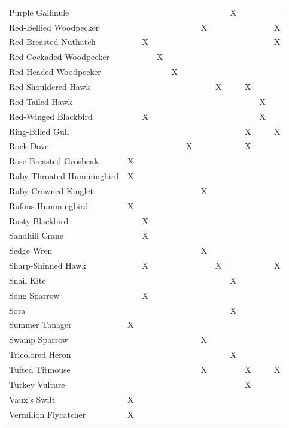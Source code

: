 \documentclass[]{article}
\begin{document}
\begin{longtable}{llllllllllll}
Purple Gallinule &  &  &  &  &  &  &  & X &  &  & \\
Red-Bellied Woodpecker &  &  &  &  &  & X &  &  &  &  & X\\
Red-Breasted Nuthatch &  & X &  &  &  &  &  &  &  &  & X\\
Red-Cockaded Woodpecker &  &  & X &  &  &  &  &  &  &  & \\
\addlinespace
Red-Headed Woodpecker &  &  &  & X &  &  &  &  &  &  & \\
Red-Shouldered Hawk &  &  &  &  &  &  & X &  & X &  & \\
Red-Tailed Hawk &  &  &  &  &  &  &  &  &  & X & \\
Red-Winged Blackbird &  & X &  &  &  &  &  &  &  & X & \\
Ring-Billed Gull &  &  &  &  &  &  &  &  & X &  & X\\
\addlinespace
Rock Dove &  &  &  &  & X &  &  &  & X &  & \\
Rose-Breasted Grosbeak & X &  &  &  &  &  &  &  &  &  & \\
Ruby-Throated Hummingbird & X &  &  &  &  &  &  &  &  &  & \\
Ruby Crowned Kinglet &  &  &  &  &  & X &  &  &  &  & \\
Rufous Hummingbird & X &  &  &  &  &  &  &  &  &  & \\
\addlinespace
Rusty Blackbird &  & X &  &  &  &  &  &  &  &  & \\
Sandhill Crane &  & X &  &  &  &  &  &  &  &  & \\
Sedge Wren &  &  &  &  &  & X &  &  &  &  & \\
Sharp-Shinned Hawk &  & X &  &  &  &  & X &  &  &  & X\\
Snail Kite &  &  &  &  &  &  &  & X &  &  & \\
\addlinespace
Song Sparrow &  & X &  &  &  &  &  &  &  &  & \\
Sora &  &  &  &  &  &  &  & X &  &  & \\
Summer Tanager & X &  &  &  &  &  &  &  &  &  & \\
Swamp Sparrow &  &  &  &  &  & X &  &  &  &  & \\
Tricolored Heron &  &  &  &  &  &  &  & X &  &  & \\
\addlinespace
Tufted Titmouse &  &  &  &  &  & X &  &  & X &  & X\\
Turkey Vulture &  &  &  &  &  &  &  &  & X &  & \\
Vaux's Swift & X &  &  &  &  &  &  &  &  &  & \\
Vermilion Flycatcher & X &  &  &  &  &  &  &  &  &  & \\

\end{longtable}
\end{document}
